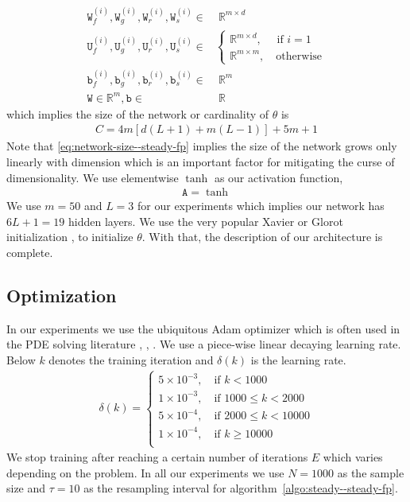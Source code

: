 \begin{align}
   \mathtt W_f^{(i)}, 
   \mathtt W_g^{(i)},  \mathtt W_r^{(i)},  \mathtt W_s^{(i)} \in&\;
   \mathbb R^{m\times d}\\
   \mathtt U_f^{(i)},
\mathtt U_g^{(i)},
\mathtt U_r^{(i)},
\mathtt U_s^{(i)}\in&
   \begin{cases}\mathbb R^{m\times d},\quad\text{ if }i=1 \\
   \mathbb R^{m\times m},\quad\text{otherwise}
   \end{cases}\\
   \mathtt b_f^{(i)},\mathtt b_g^{(i)},\mathtt b_r^{(i)},\mathtt b_s^{(i)}\in&\;\mathbb R^m\\
   \mathtt W\in\mathbb R^{m}, \mathtt b\in&\;\mathbb R
\end{align}
which implies the size of the network or cardinality of $\theta$ is
\begin{align}
    C=4m[d(L+1)+m(L-1)]+5m+1\label{eq:network-size--steady-fp}
\end{align}
Note that \eqref{eq:network-size--steady-fp} implies the size of the network grows only linearly with dimension which is an important factor for mitigating the curse of dimensionality. We use elementwise $\tanh$ as our activation function,
\begin{align}
    \mathtt A=\tanh\label{eq:activation-choice--steady-fp}
\end{align}
We use $m=50$ and $L=3$ for our experiments which implies our network has $6L+1=19$ hidden layers. We use the very popular Xavier or Glorot initialization \cite{glorot2010understanding}, \cite{datta2020survey} to initialize $\theta$. With that, the description of our architecture is complete. 

\subsection{Optimization}\label{ssec-optimization--steady-fp}
In our experiments we use the ubiquitous Adam optimizer \cite{kingma2014adam} which is often used in the PDE solving literature \cite{han2018solving}, \cite{zhai2022deep}, \cite{sirignano2018dgm}. We use a piece-wise linear decaying learning rate. Below $k$ denotes the training iteration and $\delta(k)$ is the learning rate.
\begin{align}
    \delta(k)=\begin{cases}
        5\times10^{-3},\quad\text{if } k<1000
        \\
        1\times10^{-3},\quad\text{if }1000\le k<2000\\
        5\times10^{-4},\quad\text{if }2000\le k<10000\\
        1\times10^{-4},\quad\text{if }k\ge10000\\
        \end{cases}\label{eq:learning-rate--steady-fp}
\end{align}
We stop training after reaching a certain number of iterations $E$ which varies depending on the problem. In all our experiments we use $N=1000$ as the sample size and $\tau=10$ as the resampling interval for algorithm~\ref{algo:steady--steady-fp}.

